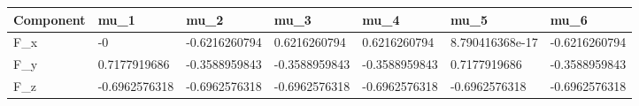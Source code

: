 \begin{tabular}{@{}lllllll@{}}
\toprule
Component & mu\_1 & mu\_2 & mu\_3 & mu\_4 & mu\_5 & mu\_6 \\
\midrule
F\_x & -0 & -0.6216260794 & 0.6216260794 & 0.6216260794 & 8.790416368e-17 & -0.6216260794 \\
F\_y & 0.7177919686 & -0.3588959843 & -0.3588959843 & -0.3588959843 & 0.7177919686 & -0.3588959843 \\
F\_z & -0.6962576318 & -0.6962576318 & -0.6962576318 & -0.6962576318 & -0.6962576318 & -0.6962576318 \\
\bottomrule
\end{tabular}
